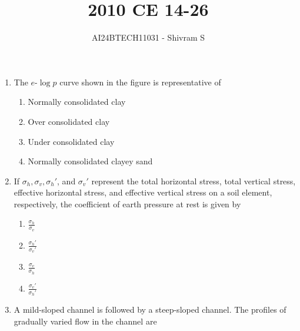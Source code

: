 \documentclass[journal]{IEEEtran}
\begin{document}

\onecolumn

\title{2010 CE 14-26}
\author{AI24BTECH11031 - Shivram S}
\maketitle
\bigskip

\renewcommand{\thefigure}{\theenumi}
\renewcommand{\thetable}{\theenumi}

\begin{enumerate}
    \item The $e$-$\log p$ curve shown in the figure is representative of 
  
        
    
        \begin{multicols}{2}
            \begin{enumerate}
                \item Normally consolidated clay
                \item Over consolidated clay
                \item Under consolidated clay
                \item Normally consolidated clayey sand
            \end{enumerate}
        \end{multicols}

    \item If $\sigma_h, \sigma_v, \sigma_h'$, and $\sigma_v'$ represent the total horizontal stress,
    total vertical stress, effective horizontal stress, and effective vertical stress on a soil
    element, respectively, the coefficient of earth pressure at rest is given by  

        \begin{multicols}{4}
            \begin{enumerate}
                \item $\frac{\sigma_h}{\sigma_v}$
                \item $\frac{\sigma_h'}{\sigma_v'}$
                \item $\frac{\sigma_v}{\sigma_h}$
                \item $\frac{\sigma_v'}{\sigma_h'}$
            \end{enumerate}
        \end{multicols}

    \item A mild-sloped channel is followed by a steep-sloped channel. The profiles of gradually
    varied flow in the channel are  


\end{enumerate}
\end{document}
